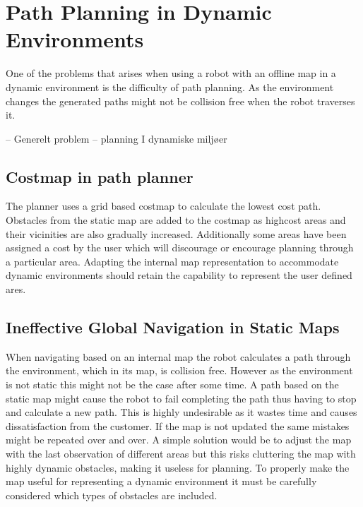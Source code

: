 \section{Path Planning in Dynamic Environments}
One of the problems that arises when using a robot with an  offline map in a dynamic environment is the difficulty of path planning.
As the environment changes the generated paths might not be collision free when the robot traverses it. 


–	Generelt problem – planning I dynamiske miljøer


\subsection{Costmap in path planner}
The planner uses a grid based costmap to calculate the lowest cost path. Obstacles from the static map are added to the costmap as highcost areas and their vicinities are also gradually increased. 
Additionally some areas have been assigned a cost by the user which will discourage or encourage planning through a particular area. 
Adapting the internal map representation to accommodate dynamic environments should retain the capability to represent the user defined ares.  


\subsection{Ineffective Global Navigation in Static Maps}
When navigating based on an internal map the robot calculates a path through the environment, which in its map, is collision free. 
However as the environment is not static this might not be the case after some time. 
A path based on the static map might cause the robot to fail completing the path thus having to stop and calculate a new path. 
This is highly undesirable as it wastes time and causes dissatisfaction from the customer. 
If the map is not updated the same mistakes might be repeated over and over. 
A simple solution would be to adjust the map with the last observation of different areas but this risks cluttering the map with highly dynamic obstacles, making it useless for planning.
To properly make the map useful for representing a dynamic environment it must be carefully considered which types of obstacles are included. 


